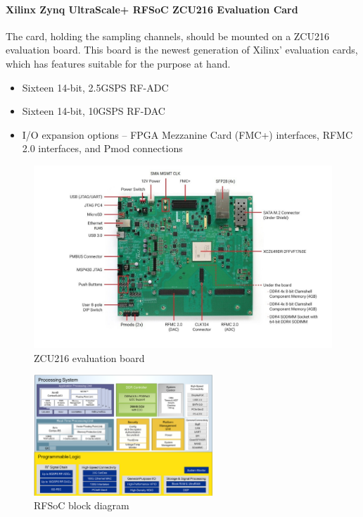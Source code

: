 \paragraph{Xilinx Zynq UltraScale+ RFSoC ZCU216 Evaluation Card}
The card, holding the sampling channels, should be mounted on a ZCU216 evaluation board. This board is the newest generation of Xilinx' evaluation cards, which has features suitable for the purpose at hand.
\begin{itemize}[noitemsep]
\item Sixteen 14-bit, 2.5GSPS RF-ADC
\item Sixteen 14-bit, 10GSPS RF-DAC
\item I/O expansion options – FPGA Mezzanine Card (FMC+) interfaces, RFMC 2.0 interfaces, and Pmod connections
\end{itemize}
\begin{figure}[H]
	\centering
	\includegraphics[width = \textwidth]{chap/03-work/img/zcu216}
	\caption{ZCU216 evaluation board}
	\label{fig:zcu216}
\end{figure}
 
\begin{figure}[H]
	\centering
	\includegraphics[width = 0.6\textwidth]{chap/03-work/img/rfsoc_blockdiagram}
	\caption{RFSoC block diagram}
	\label{fig:rfsoc}
\end{figure}

